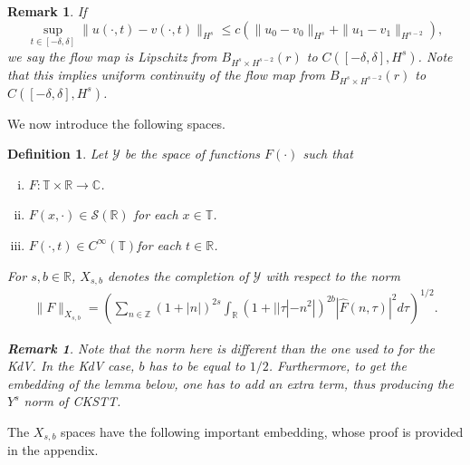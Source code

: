 \documentclass[12pt,reqno]{amsart}
\numberwithin{equation}{section}  %
\newcommand{\rr}{\mathbb{R}}
\newcommand{\zz}{\mathbb{Z}}
\newcommand{\cc}{\mathbb{C}}
\newcommand{\ci}{\mathbb{T}}
\newcommand{\wh}{\widehat}
\newtheorem{definition}[theorem]{Definition}
\newtheorem{remark}[theorem]{Remark}
\begin{document}
%
%
\begin{framed}
\begin{remark}
  If $$\sup_{t \in [-\delta, \delta]}\|u(\cdot, t) - v(\cdot, t)
  \|_{H^{s}} \le c \left( \|u_{0} - v_0 \|_{H^{s}} + \|u_{1} - v_1 \|_{H^{s-2}}
  \right),$$ we
  say the flow map is \emph{Lipschitz} from $B_{H^{s} \times H^{s-2}}(r)$ 
  to $C(\left[ -\delta, \delta \right], H^s)$. 
%
%
Note that this implies uniform continuity of the flow map from $B_{H^{s}
\times H^{s-2}}(r)$ to $C(\left[ -\delta, \delta \right], H^s)$.
\label{rem:lipschitz-cont}
\end{remark}
\end{framed}
%
%
We now introduce the following spaces. 
%
%
\begin{definition}
  Let $\mathcal{Y}$ be the space of functions $F(\cdot)$ such that
  \begin{enumerate}[(i)]
   \item{$F: \ci \times \rr \to \cc$}.
   \item{$F(x, \cdot) \in \mathcal{S}(\rr)$ for each $x \in \ci$}.
   \item{$F(\cdot, t) \in C^{\infty}(\ci)$for each $t \in \rr$}.
  \end{enumerate}
  For $s, b \in \rr$, $X_{s,b}$ denotes the completion of $\mathcal{Y}$ with
  respect to the norm
  \begin{equation}
  \begin{split}
    \|F\|_{X_{s,b}} = \left( \sum_{n \in \zz} (1 + |n|)^{2s} \int_{\rr}
    (1 + | | \tau | - n^{2} |)^{2b} |\wh{F}(n, \tau)|^{2} d \tau\right)^{1/2}.
  \end{split}
  \label{eqn:bous-norm}
  \end{equation}
  \begin{framed}
    \begin{remark}
    Note that the norm here is different than the one used to for the KdV. In
    the KdV case, $b$ has to be equal to $1/2$. Furthermore, to get the embedding
    of the lemma below, one has to add an extra term, thus producing the
    $Y^{s}$ norm of CKSTT\@.
    \label{rem:alternate-space}
    \end{remark}
  \end{framed}
\end{definition}
%
The $X_{s,b}$ spaces have the following important embedding, whose proof is
provided in the appendix.
%
%
%
%
%
%
\end{document}
